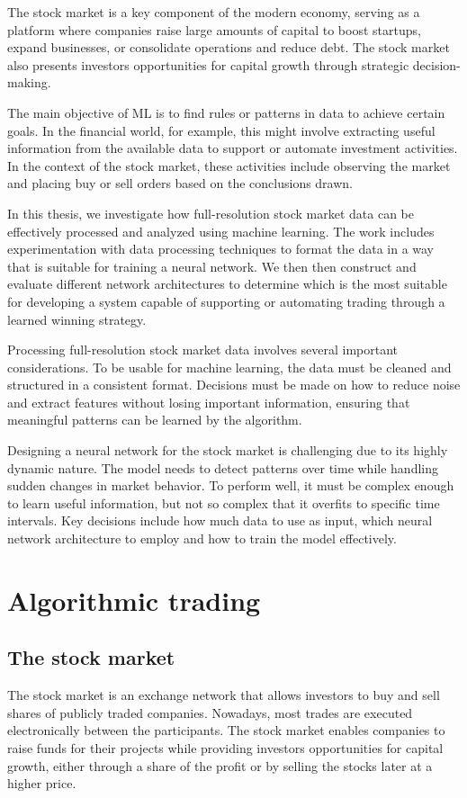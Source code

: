 \documentclass[a4paper,oneside,onecolumn,12pt]{book}
\begin{document}
The stock market is a key component of the modern economy, serving as a platform where companies raise large amounts of capital to boost startups, expand businesses, or consolidate operations and reduce debt.\cite{WSMandHDIW} The stock market also presents investors opportunities for capital growth through strategic decision-making. 

The main objective of ML is to find rules or patterns in data to achieve certain goals. In the financial world, for example, this might involve extracting useful information from the available data to support or automate investment activities. In the context of the stock market, these activities include observing the market and placing buy or sell orders based on the conclusions drawn. \cite{MLAT}

In this thesis, we investigate how full-resolution stock market data can be effectively processed and analyzed using machine learning. The work includes experimentation with data processing techniques to format the data in a way that is suitable for training a neural network. We then then construct and evaluate different network architectures to determine which is the most suitable for developing a system capable of supporting or automating trading through a learned winning strategy.

Processing full-resolution stock market data involves several important considerations. To be usable for machine learning, the data must be cleaned and structured in a consistent format. Decisions must be made on how to reduce noise and extract features without losing important information, ensuring that meaningful patterns can be learned by the algorithm.

Designing a neural network for the stock market is challenging due to its highly dynamic nature. The model needs to detect patterns over time while handling sudden changes in market behavior. To perform well, it must be complex enough to learn useful information, but not so complex that it overfits to specific time intervals. Key decisions include how much data to use as input, which neural network architecture to employ and how to train the model effectively.

\chapter{Algorithmic trading}
\section{The stock market}
The stock market is an exchange network that allows investors to buy and sell shares of publicly traded companies. Nowadays, most trades are executed electronically between the participants. The stock market enables companies to raise funds for their projects while providing investors opportunities for capital growth, either through a share of the profit or by selling the stocks later at a higher price. \cite{WSMandHDIW}
\end{document}
